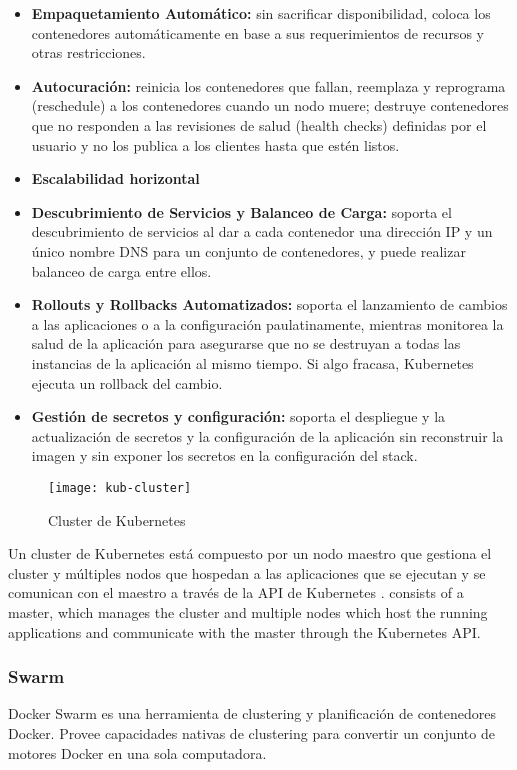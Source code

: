 \begin{itemize}

\item \textbf{Empaquetamiento Automático: }sin sacrificar disponibilidad, coloca los contenedores automáticamente en base a sus requerimientos de recursos y otras restricciones.
\item \textbf{Autocuración: }reinicia los contenedores que fallan, reemplaza y reprograma (reschedule) a los contenedores cuando un nodo muere; destruye contenedores que no responden a las revisiones de salud (health checks) definidas por el usuario y no los publica a los clientes hasta que estén listos.
\item \textbf{Escalabilidad horizontal}
\item \textbf{Descubrimiento de Servicios y Balanceo de Carga: }soporta el descubrimiento de servicios al dar a cada contenedor una dirección IP y un único nombre DNS para un conjunto de contenedores, y puede realizar balanceo de carga entre ellos.
\item \textbf{Rollouts y Rollbacks Automatizados: }soporta el lanzamiento de cambios a las aplicaciones o a la configuración paulatinamente, mientras monitorea la salud de la aplicación para asegurarse que no se destruyan a todas las instancias de la aplicación al mismo tiempo. Si algo fracasa, Kubernetes ejecuta un rollback del cambio.
\item \textbf{Gestión de secretos y configuración: }soporta el despliegue y la actualización de secretos y la configuración de la aplicación sin reconstruir la imagen y sin exponer los secretos en la configuración del stack.

\end{itemize}

\begin{figure}[H]
    \centering
    \texttt{[image: kub-cluster]}
    \caption{ Cluster de Kubernetes \parencite{Kubernetes2016-jo}}
    \label{fig:kub-cluster}
\end{figure}

Un cluster de Kubernetes está compuesto por un nodo maestro que gestiona el cluster y múltiples nodos que hospedan a las aplicaciones que se ejecutan y se comunican con el maestro a través de la API de Kubernetes \parencite{Kubernetes2016-jo}.
consists of a master, which manages the cluster and multiple nodes which host the running applications and communicate with the master through the Kubernetes API.


\subsubsection{Swarm}
Docker Swarm \parencite{Docker2016-yo} es una herramienta de clustering y planificación de contenedores Docker. Provee capacidades nativas de clustering para convertir un conjunto de motores Docker en una sola computadora.

